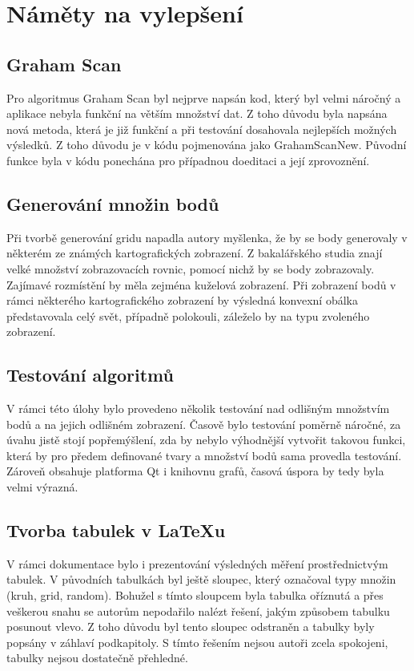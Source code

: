 \documentclass[a4paper, 12pt]{article}
\begin{document}
\section{Náměty na vylepšení}
\subsection{Graham Scan}
Pro algoritmus Graham Scan byl nejprve napsán kod, který byl velmi náročný a aplikace nebyla funkční na větším množství dat. Z toho důvodu byla napsána nová metoda, která je již funkční a při testování dosahovala nejlepších možných výsledků. Z toho důvodu je v kódu pojmenována jako GrahamScanNew. Původní funkce byla v kódu ponechána pro případnou doeditaci a její zprovoznění.

\subsection{Generování množin bodů}
Při tvorbě generování gridu napadla autory myšlenka, že by se body generovaly v některém ze známých kartografických zobrazení. Z bakalářského studia znají velké množství zobrazovacích rovnic, pomocí nichž by se body zobrazovaly. Zajímavé rozmístění by měla zejména kuželová zobrazení. Při zobrazení bodů v rámci některého kartografického zobrazení by výsledná konvexní obálka představovala celý svět, případně polokouli, záleželo by na typu zvoleného zobrazení.

\subsection{Testování algoritmů}
V rámci této úlohy bylo provedeno několik testování nad odlišným množstvím bodů a na jejich odlišném zobrazení. Časově bylo testování poměrně náročné, za úvahu jistě stojí popřemýšlení, zda by nebylo výhodnější vytvořit takovou funkci, která by pro předem definované tvary a množství bodů sama provedla testování. Zároveň obsahuje platforma Qt i knihovnu grafů, časová úspora by tedy byla velmi výrazná.


\subsection{Tvorba tabulek v LaTeXu}
V rámci dokumentace bylo i prezentování výsledných měření prostřednictvým tabulek. V původních tabulkách byl ještě sloupec, který označoval typy množin (kruh, grid, random). Bohužel s tímto sloupcem byla tabulka oříznutá a přes veškerou snahu se autorům nepodařilo nalézt řešení, jakým způsobem tabulku posunout vlevo. Z toho důvodu byl tento sloupec odstraněn a tabulky byly popsány v záhlaví podkapitoly. S tímto řešením nejsou autoři zcela spokojeni, tabulky nejsou dostatečně přehledné. 
\end{document}
